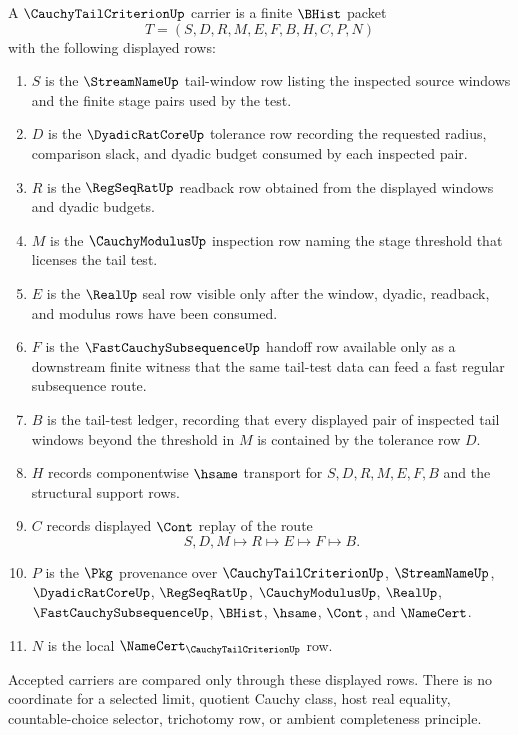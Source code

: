 \begin{definition}
\label{def:cauchy-tail-criterion-carrier}
A $\CauchyTailCriterionUp$ carrier is a finite $\BHist$ packet
$$
T=(S,D,R,M,E,F,B,H,C,P,N)
$$
with the following displayed rows:
\begin{enumerate}
\item $S$ is the $\StreamNameUp$ tail-window row listing the inspected source windows and the finite stage pairs used by the test.
\item $D$ is the $\DyadicRatCoreUp$ tolerance row recording the requested radius, comparison slack, and dyadic budget consumed by each inspected pair.
\item $R$ is the $\RegSeqRatUp$ readback row obtained from the displayed windows and dyadic budgets.
\item $M$ is the $\CauchyModulusUp$ inspection row naming the stage threshold that licenses the tail test.
\item $E$ is the $\RealUp$ seal row visible only after the window, dyadic, readback, and modulus rows have been consumed.
\item $F$ is the $\FastCauchySubsequenceUp$ handoff row available only as a downstream finite witness that the same tail-test data can feed a fast regular subsequence route.
\item $B$ is the tail-test ledger, recording that every displayed pair of inspected tail windows beyond the threshold in $M$ is contained by the tolerance row $D$.
\item $H$ records componentwise $\hsame$ transport for $S,D,R,M,E,F,B$ and the structural support rows.
\item $C$ records displayed $\Cont$ replay of the route
$$
S,D,M \longmapsto R \longmapsto E \longmapsto F \longmapsto B .
$$
\item $P$ is the $\Pkg$ provenance over $\CauchyTailCriterionUp$, $\StreamNameUp$, $\DyadicRatCoreUp$, $\RegSeqRatUp$, $\CauchyModulusUp$, $\RealUp$, $\FastCauchySubsequenceUp$, $\BHist$, $\hsame$, $\Cont$, and $\NameCert$.
\item $N$ is the local $\NameCert_{\CauchyTailCriterionUp}$ row.
\end{enumerate}
Accepted carriers are compared only through these displayed rows. There is no coordinate for a selected limit, quotient Cauchy class, host real equality, countable-choice selector, trichotomy row, or ambient completeness principle.
\end{definition}

